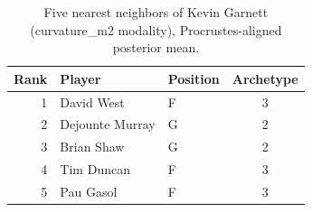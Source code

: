 \begin{table}[htbp]
  \centering\small
  \begin{tabular}{rllc}
    \toprule
    Rank & Player & Position & Archetype \\
    \midrule
    1 & David West & F & 3 \\
    2 & Dejounte Murray & G & 2 \\
    3 & Brian Shaw & G & 2 \\
    4 & Tim Duncan & F & 3 \\
    5 & Pau Gasol & F & 3 \\
    \bottomrule
  \end{tabular}
  \caption{Five nearest neighbors of Kevin Garnett (curvature_m2 modality), Procrustes-aligned posterior mean.}
  \label{tab:Kevin_Garnett_neighbors_curvature_m2}
\end{table}

